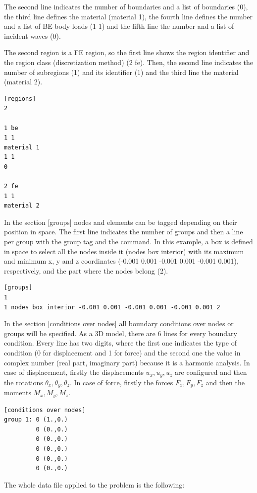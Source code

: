 \documentclass[a4]{article}
\begin{document}
The second line indicates the number of boundaries and a list of boundaries (0), the third line defines the material (material 1), the fourth line defines the number and a list of BE body loads (1 1) and the fifth line the number and a list of incident waves (0).

The second region is a FE region, so the first line shows the region identifier and the region class (discretization method) (2 fe). Then, the second line indicates the number of subregions (1) and its identifier (1) and the third line the material (material 2). 

\begin{Verbatim}	
[regions]
2

1 be
1 1
material 1
1 1
0

2 fe
1 1
material 2
\end{Verbatim}

In the section [groups] nodes and elements can be tagged depending on their position in space. The first line indicates the number of groups and then a line per group with the group tag and the command. In this example, a box is defined in space to select all the nodes inside it (nodes box interior) with its maximum and minimum x, y and z coordinates (-0.001 0.001 -0.001 0.001 -0.001 0.001), respectively, and the part where the nodes belong (2).    

\begin{Verbatim}
[groups]
1
1 nodes box interior -0.001 0.001 -0.001 0.001 -0.001 0.001 2 
\end{Verbatim}

In the section [conditions over nodes] all boundary conditions over nodes or groups will be specified. As a 3D model, there are 6 lines for every boundary condition. Every line has two digits, where the first one indicates the type of condition (0 for displacement and 1 for force) and the second one the value in complex number (real part, imaginary part) because it is a harmonic analysis. In case of displacement, firstly the displacements $u_x, u_y, u_z$ are configured and then the rotations $\theta_x, \theta_y, \theta_z$. In case of force, firstly the forces $F_x, F_y, F_z$ and then the moments $M_x, M_y, M_z$. 

\begin{Verbatim}	
[conditions over nodes]
group 1: 0 (1.,0.)
         0 (0.,0.)
         0 (0.,0.)
         0 (0.,0.)
         0 (0.,0.)
         0 (0.,0.)
\end{Verbatim}

The whole data file applied to the problem is the following:
\end{document}
